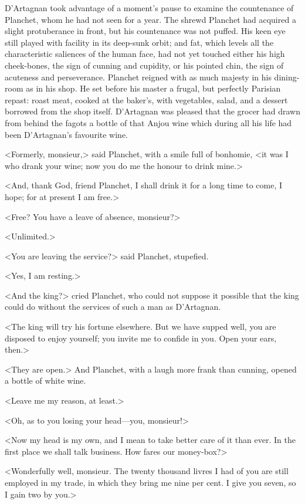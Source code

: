 D'Artagnan took advantage of a moment's pause to examine the countenance of Planchet, whom he had not seen for a year. The shrewd Planchet had acquired a slight protuberance in front, but his countenance was not puffed. His keen eye still played with facility in its deep-sunk orbit; and fat, which levels all the characteristic saliences of the human face, had not yet touched either his high cheek-bones, the sign of cunning and cupidity, or his pointed chin, the sign of acuteness and perseverance. Planchet reigned with as much majesty in his dining-room as in his shop. He set before his master a frugal, but perfectly Parisian repast: roast meat, cooked at the baker's, with vegetables, salad, and a dessert borrowed from the shop itself. D'Artagnan was pleased that the grocer had drawn from behind the fagots a bottle of that Anjou wine which during all his life had been D'Artagnan's favourite wine.

<Formerly, monsieur,> said Planchet, with a smile full of bonhomie, <it was I who drank your wine; now you do me the honour to drink mine.>

<And, thank God, friend Planchet, I shall drink it for a long time to come, I hope; for at present I am free.>

<Free? You have a leave of absence, monsieur?>

<Unlimited.>

<You are leaving the service?> said Planchet, stupefied.

<Yes, I am resting.>

<And the king?> cried Planchet, who could not suppose it possible that the king could do without the services of such a man as D'Artagnan.

<The king will try his fortune elsewhere. But we have supped well, you are disposed to enjoy yourself; you invite me to confide in you. Open your ears, then.>

<They are open.> And Planchet, with a laugh more frank than cunning, opened a bottle of white wine.

<Leave me my reason, at least.>

<Oh, as to you losing your head—you, monsieur!>

<Now my head is my own, and I mean to take better care of it than ever. In the first place we shall talk business. How fares our money-box?>

<Wonderfully well, monsieur. The twenty thousand livres I had of you are still employed in my trade, in which they bring me nine per cent. I give you seven, so I gain two by you.>

